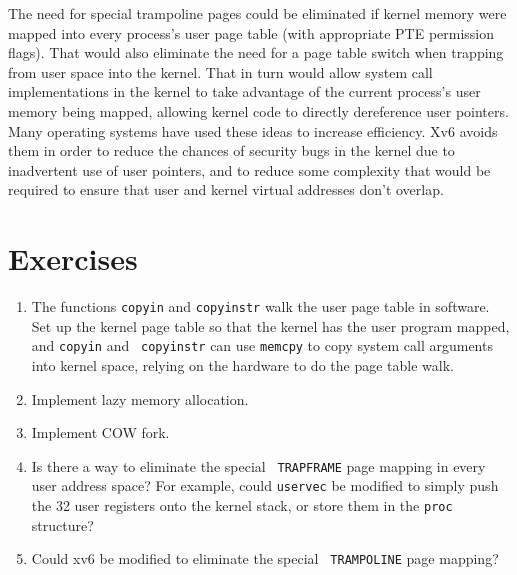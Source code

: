 The need for special trampoline pages could be eliminated if kernel
memory were mapped into every process's user page table (with
appropriate PTE permission flags). That would
also eliminate the need for a page table switch when trapping from
user space into the kernel. That in turn would allow system call
implementations in the kernel to take advantage of the current
process's user memory being mapped, allowing kernel code to directly
dereference user pointers. Many operating systems have used these ideas to
increase efficiency. Xv6 avoids them in order to reduce the chances of
security bugs in the kernel due to inadvertent use of user pointers,
and to reduce some complexity that would be required to ensure that
user and kernel virtual addresses don't overlap.

\section{Exercises}

\begin{enumerate}

\item The functions {\tt copyin} and {\tt copyinstr} walk the user
  page table in software.  Set up the kernel page table so that the
  kernel has the user program mapped, and {\tt copyin} and {\tt
    copyinstr} can use {\tt memcpy} to copy system call arguments into
  kernel space, relying on the hardware to do the page table walk.

\item Implement lazy memory allocation.

\item Implement COW fork.

\item Is there a way to eliminate the special {\tt
  TRAPFRAME} page mapping in every user address space? For
  example, could
  {\tt uservec} be modified to simply push the 32 user registers
  onto the kernel stack, or store them in the {\tt proc}
  structure?

\item Could xv6 be modified to eliminate the special {\tt
  TRAMPOLINE} page mapping?

\end{enumerate}
